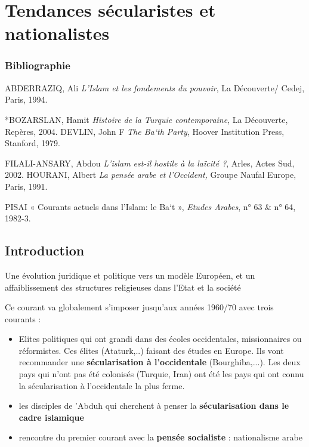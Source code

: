 
\chapter{{Tendances sécularistes et nationalistes}}
 
 \subsection{Bibliographie}
 
  ABDERRAZIQ, Ali \emph{L'Islam et les fondements du pouvoir}, La
  Découverte/ Cedej, Paris, 1994.
 
*BOZARSLAN, Hamit \emph{Histoire de la Turquie contemporaine}, La
Découverte, Repères, 2004. DEVLIN, John F \emph{The Ba`th Party}, Hoover
Institution Press, Stanford, 1979.

FILALI-ANSARY, Abdou \emph{L'islam est-il hostile à la laïcité ?},
Arles, Actes Sud, 2002. HOURANI, Albert \emph{La pensée arabe et
l'Occident,} Groupe Naufal Europe, Paris, 1991.

PISAI « Courants actuels dans l'Islam: le Ba`t », \emph{Etudes Arabes},
n° 63 \& n° 64, 1982-3.
 




\section{Introduction}
\begin{Def}[Sécularisme]
Une évolution juridique et politique vers un modèle Européen, et un affaiblissement des structures religieuses dans l'Etat et la société
\end{Def}

Ce courant va globalement s'imposer jusqu'aux années 1960/70 avec trois courants : 
\begin{itemize}
    \item Elites politiques qui ont grandi dans des écoles occidentales, missionnaires ou réformistes. Ces élites (Ataturk,..) faisant des études en Europe. Ils vont recommander une\textbf{ sécularisation à l'occidentale} (Bourghiba,...). Les deux pays qui n'ont pas été colonisés (Turquie, Iran) ont été les pays qui ont connu la sécularisation à l'occidentale la plus ferme.
    \item les disciples de 'Abduh qui cherchent à penser la \textbf{sécularisation dans le cadre islamique}
    \item rencontre du premier courant avec la \textbf{pensée socialiste} : nationalisme arabe
\end{itemize}
 ~
